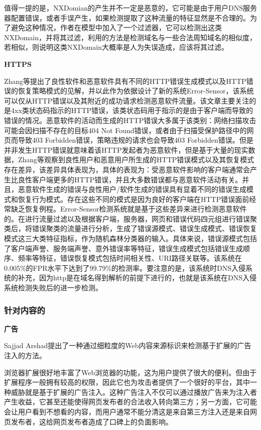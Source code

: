 \documentclass[11pt]{article} %
\begin{document}
值得一提的是，NXDomian的产生并不一定是恶意的，它可能是由于用户DNS服务器配置错误，或者手误产生，如果检测提取了这种流量的特征显然是不合理的。为了避免这种情况，作者在模型中加入了一个过滤器，它可以检测出这类NXDomain，并将其过滤，利用的方法是检测域名与一些合法周知域名的相似度，若相似，则说明这类NXDomain大概率是人为失误造成，应该将其过滤。

\textbf{HTTPS}

Zhang等提出了良性软件和恶意软件具有不同的HTTP错误生成模式以及HTTP错误的恢复策略模式的见解，并以此作为依据设计了新的系统Error-Sensor，该系统可以仅从HTTP错误以及其附近的成功请求检测恶意软件流量。该文章主要关注的是4xx类状态码指示的HTTP错误，该类状态码用于指示的是由于客户端而导致的错误的情况。恶意软件的活动而生成的HTTP错误大多属于该类别：网络扫描攻击可能会因扫描不存在的目标404 Not Found错误，或者由于扫描受保护路径中的网页而导致403 Forbidden错误，策略违规的请求也会导致403 Forbidden错误。但是并非发生HTTP错误就意味着该HTTP发起者为恶意软件，但是基于大量的现实数据，Zhang等观察到良性用户和恶意用户所生成的HTTP错误模式以及其恢复模式存在差异，该差异具体表现为，具体的表现为：受恶意软件影响的客户端通常会产生比良性客户端更多的HTTP错误，并且大多数错误都与恶意软件活动有关。并且，恶意软件生成的错误与良性用户/软件生成的错误具有显着不同的错误生成模式和恢复行为模式。存在这些不同的模式是因为良好的客户端在HTTP错误面前经常缺乏恢复例程。Error-Sensor检测系统就是基于这些差异来进行检测恶意软件的。在进行流量过滤以及根据客户端，服务器，网页和错误代码四元组进行错误聚类后，将错误聚类的流量进行分析，生成了错误源模式、错误生成模式、错误恢复模式这三大类特征指标，作为随机森林分类器的输入。具体来说，错误源模式包括了客户端声誉、服务端声誉、意外错误率等特征，错误生成模式包括错误生成顺序、频率等特征，错误恢复模式包括时间相关性、URI路径关联等。该系统在0.005\%的FPR水平下达到了99.79\%的检测率。要注意的是，该系统时DNS入侵系统的补充，因为http是在域名得到解析的前提下进行的，也就是该系统在DNS入侵系统检测失败后的进一步检测。

\subsubsection{针对内容的}
\label{content}

\textbf{广告}

Sajjad Arshad提出了一种通过细粒度的Web内容来源标识来检测基于扩展的广告注入的方法。

浏览器扩展很好地丰富了Web浏览器的功能，这为用户提供了很大的便利。但由于扩展程序一般拥有较高的权限，因此它也为攻击者提供了一个很好的平台，其中一种威胁就是基于扩展的广告注入。这种广告注入不仅可以通过播放广告来为注入者产生收益，它甚至还能使得网页发布者的合法收入转向第三方；另一方面，它可能会让用户看到不想看的内容，而用户通常不能分清这是来自第三方注入还是来自网页发布者，这给网页发布者造成了口碑上的负面影响。
\end{document}
